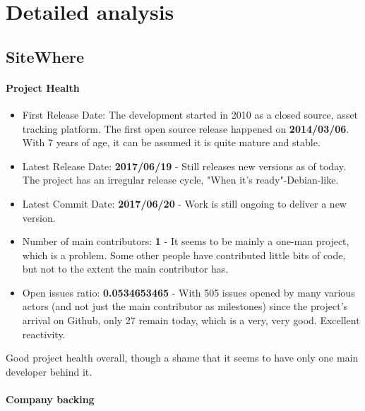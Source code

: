 \documentclass{article}
\begin{document}
\newpage

\section{Detailed analysis}

\subsection{SiteWhere}

\paragraph{Project Health}

\begin{itemize}
\item First Release Date: The development started in 2010 as a closed source, asset tracking platform. The first open source release happened on \textbf{2014/03/06}. With 7 years of age, it can be assumed it is quite mature and stable.
\item Latest Release Date: \textbf{2017/06/19} - Still releases new versions as of today. The project has an irregular release cycle, "When it's ready"-Debian-like.
\item Latest Commit Date: \textbf{2017/06/20} - Work is still ongoing to deliver a new version.
\item Number of main contributors: \textbf{1} - It seems to be mainly a one-man project, which is a problem. Some other people have contributed little bits of code, but not to the extent the main contributor has.
\item Open issues ratio: \textbf{0.0534653465} - With 505 issues opened by many various actors (and not just the main contributor as milestones) since the project's arrival on Github, only 27 remain today, which is a very, very good. Excellent reactivity.
\end{itemize}

Good project health overall, though a shame that it seems to have only one main developer behind it.

\paragraph{Company backing}
\end{document}

